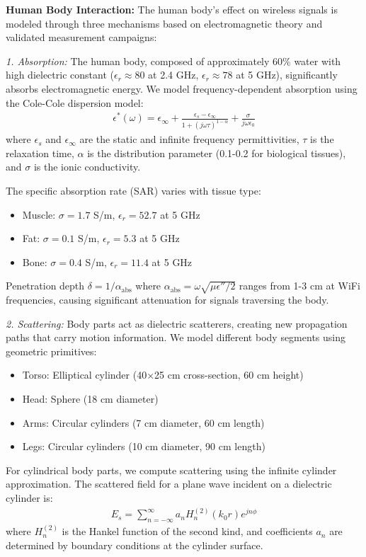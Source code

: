 \documentclass[journal]{IEEEtran}
\begin{document}
\textbf{Human Body Interaction:} The human body's effect on wireless signals is modeled through three mechanisms based on electromagnetic theory and validated measurement campaigns:

\textit{1. Absorption:} The human body, composed of approximately 60\% water with high dielectric constant ($\epsilon_r \approx 80$ at 2.4 GHz, $\epsilon_r \approx 78$ at 5 GHz), significantly absorbs electromagnetic energy. We model frequency-dependent absorption using the Cole-Cole dispersion model:
\begin{align}
\epsilon^*(\omega) = \epsilon_\infty + \frac{\epsilon_s - \epsilon_\infty}{1 + (j\omega\tau)^{1-\alpha}} + \frac{\sigma}{j\omega\epsilon_0}
\end{align}
where $\epsilon_s$ and $\epsilon_\infty$ are the static and infinite frequency permittivities, $\tau$ is the relaxation time, $\alpha$ is the distribution parameter (0.1-0.2 for biological tissues), and $\sigma$ is the ionic conductivity.

The specific absorption rate (SAR) varies with tissue type:
\begin{itemize}
\item Muscle: $\sigma = 1.7$ S/m, $\epsilon_r = 52.7$ at 5 GHz
\item Fat: $\sigma = 0.1$ S/m, $\epsilon_r = 5.3$ at 5 GHz  
\item Bone: $\sigma = 0.4$ S/m, $\epsilon_r = 11.4$ at 5 GHz
\end{itemize}

Penetration depth $\delta = 1/\alpha_{\text{abs}}$ where $\alpha_{\text{abs}} = \omega\sqrt{\mu\epsilon''/2}$ ranges from 1-3 cm at WiFi frequencies, causing significant attenuation for signals traversing the body.

\textit{2. Scattering:} Body parts act as dielectric scatterers, creating new propagation paths that carry motion information. We model different body segments using geometric primitives:
\begin{itemize}
\item Torso: Elliptical cylinder (40×25 cm cross-section, 60 cm height)
\item Head: Sphere (18 cm diameter)
\item Arms: Circular cylinders (7 cm diameter, 60 cm length)
\item Legs: Circular cylinders (10 cm diameter, 90 cm length)
\end{itemize}

For cylindrical body parts, we compute scattering using the infinite cylinder approximation. The scattered field for a plane wave incident on a dielectric cylinder is:
\begin{align}
E_s = \sum_{n=-\infty}^{\infty} a_n H_n^{(2)}(k_0 r) e^{jn\phi}
\end{align}
where $H_n^{(2)}$ is the Hankel function of the second kind, and coefficients $a_n$ are determined by boundary conditions at the cylinder surface.
\end{document}
